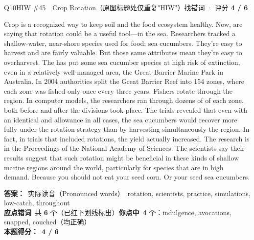 \begin{qblock}{Q10\quad HIW \#45\ \ Crop Rotation（原图标题处仅重复"HIW"）}{找错词 · 评分 \textcolor{cAccent}{\bfseries 4 / 6}}
\begin{promptbox}
Crop  is a recognized way to keep soil and the food ecosystem healthy. Now,  are saying that rotation could be a useful tool---in the sea. Researchers tracked a shallow-water, near-shore species used for food: sea cucumbers. They're easy to harvest and are fairly valuable. But those same attributes mean they're easy to overharvest. The  has put some sea cucumber species at high risk of extinction, even in a relatively well-managed area, the Great Barrier Marine Park in Australia. In 2004 authorities split the Great Barrier Reef into 154 zones, where each zone was fished only once every three years. Fishers rotate through the region. In computer models, the researchers ran through dozens of  of each zone, both before and after the divisions took place. The trials revealed that even with an identical and  allowance in all cases, the sea cucumbers would recover more fully under the rotation strategy than by harvesting simultaneously  the region. In fact, in trials that included rotations, the yield actually increased. The research is in the Proceedings of the National Academy of Sciences. The scientists say their results suggest that such rotation might be beneficial in these kinds of shallow marine regions around the world, particularly for species that are in high demand. Because you should not eat your seed corn. Or your seed sea cucumbers.
\end{promptbox}
\par\smallskip
\textbf{答案：}\ 实际读音（Pronounced words）\ {\color{cFix}rotation, scientists, practice, simulations, low-catch, throughout}\\
\textbf{应点错词}\ 共 \textbf{6} 个（已红下划线标出）\qquad\textbf{你点中}\ \textbf{4} 个：indulgence, avocations, snapped, couched（均正确）\\[2pt]\textbf{本题得分：}\ {\color{cAccent}\bfseries 4 / 6}
\end{qblock}

